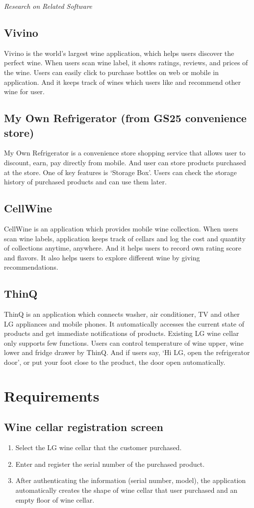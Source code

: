 \documentclass[conference]{IEEEtran}
\numberwithin{figure}{subsection}
\begin{document}
\noindent \textit{Research on Related Software}
\subsection{Vivino}
Vivino is the world’s largest wine application, which helps users discover the perfect wine. When users scan wine label, it shows ratings, reviews, and prices of the wine. Users can easily click to purchase bottles on web or mobile in application. And it keeps track of wines which users like and recommend other wine for user.
  
\subsection{My Own Refrigerator (from GS25 convenience store)}
My Own Refrigerator is a convenience store shopping service that allows user to discount, earn, pay directly from mobile. And user can store products purchased at the store. One of key features is ‘Storage Box’. Users can check the storage history of purchased products and can use them later.

\subsection{CellWine}
CellWine is an application which provides mobile wine collection. When users scan wine labels, application keeps track of cellars and log the cost and quantity of collections anytime, anywhere. And it helps users to record own rating score and flavors. It also helps users to explore different wine by giving recommendations. 

\subsection{ThinQ}
ThinQ is an application which connects washer, air conditioner, TV and other LG appliances and mobile phones. It automatically accesses the current state of products and get immediate notifications of products. Existing LG wine cellar only supports few functions. Users can control temperature of wine upper, wine lower and fridge drawer by ThinQ. And if users say, ‘Hi LG, open the refrigerator door’, or put your foot close to the product, the door open automatically.

\section{Requirements}
\subsection {\textbf{Wine cellar registration screen}}
\begin{enumerate}
    \item Select the LG wine cellar that the customer purchased.
    \item Enter and register the serial number of the purchased product.
    \item After authenticating the information (serial number, model), the application automatically creates the shape of wine cellar that user purchased and an empty floor of wine cellar.
\end{enumerate}
\end{document}
